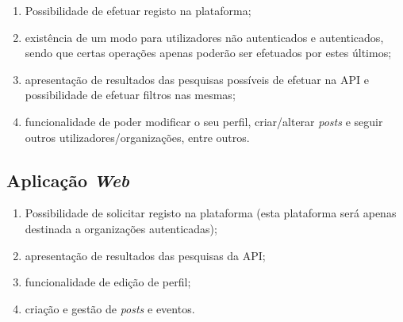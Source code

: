 \begin{enumerate}
	\item Possibilidade de efetuar registo na plataforma;
	\item existência de um modo para utilizadores não autenticados e autenticados, sendo que certas operações apenas poderão ser efetuados por estes últimos;
	\item apresentação de resultados das pesquisas possíveis de efetuar na API e possibilidade de efetuar filtros nas mesmas;
	\item funcionalidade de poder modificar o seu perfil, criar/alterar \textit{posts} e seguir outros utilizadores/organizações, entre outros.
\end{enumerate}

\subsection*{Aplicação \textit{Web}}

\begin{enumerate}
	\item Possibilidade de solicitar registo na plataforma (esta plataforma será apenas destinada a organizações autenticadas);
	\item apresentação de resultados das pesquisas da API;
	\item funcionalidade de edição de perfil;
	\item criação e gestão de \textit{posts} e eventos.
\end{enumerate}